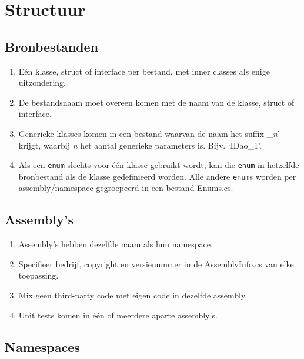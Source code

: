 \documentclass[a4paper,11pt]{article}
\begin{document}
\section{Structuur}

\subsection{Bronbestanden}

\begin{enumerate}[resume]
\item E\'en klasse, struct of interface per bestand, met inner classes als enige uitzondering.
\item De bestandsnaam moet overeen komen met de naam van de klasse, struct
of interface.
\item Generieke klasses  komen in een bestand waarvan de naam het suffix
\_{\em n}' krijgt, waarbij {\em n} het aantal generieke parameters
is.  Bijv. `IDao\_1'.
\item Als een \lstinline !enum! slechts voor \'e\'en klasse gebruikt
wordt, kan die \lstinline !enum! in hetzelfde bronbestand als de klasse
gedefinieerd worden.  Alle andere \lstinline !enum!s worden per
assembly/namespace gegroepeerd in een bestand Enums.cs.

\end{enumerate}

\subsection{Assembly's}

\begin{enumerate}[resume]
\item Assembly's hebben dezelfde naam als hun namespace.
\item Specifieer bedrijf, copyright en versienummer in de AssemblyInfo.cs van
elke toepassing.
\item Mix geen third-party code met eigen code in dezelfde assembly.
\item Unit tests komen in \'e\'en of meerdere aparte
assembly's.
\end{enumerate}

\subsection{Namespaces}
\end{document}
